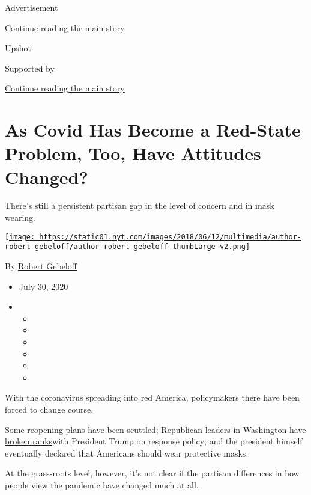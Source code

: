 Advertisement

\protect\hyperlink{after-top}{Continue reading the main story}

Upshot

Supported by

\protect\hyperlink{after-sponsor}{Continue reading the main story}

\hypertarget{as-covid-has-become-a-red-state-problem-too-have-attitudes-changed}{%
\section{As Covid Has Become a Red-State Problem, Too, Have Attitudes
Changed?}\label{as-covid-has-become-a-red-state-problem-too-have-attitudes-changed}}

There's still a persistent partisan gap in the level of concern and in
mask wearing.

\href{https://www.nytimes.com/by/robert-gebeloff}{\texttt{[image: https://static01.nyt.com/images/2018/06/12/multimedia/author-robert-gebeloff/author-robert-gebeloff-thumbLarge-v2.png]}}

By \href{https://www.nytimes.com/by/robert-gebeloff}{Robert Gebeloff}

\begin{itemize}
\item
  July 30, 2020
\item
  \begin{itemize}
  \item
  \item
  \item
  \item
  \item
  \item
  \end{itemize}
\end{itemize}

With the coronavirus spreading into red America, policymakers there have
been forced to change course.

Some reopening plans have been scuttled; Republican leaders in
Washington have
\href{https://www.nytimes.com/2020/07/19/us/politics/republicans-contradict-trump-coronavirus.html}{broken
ranks}with President Trump on response policy; and the president himself
eventually declared that Americans should wear protective masks.

At the grass-roots level, however, it's not clear if the partisan
differences in how people view the pandemic have changed much at all.

